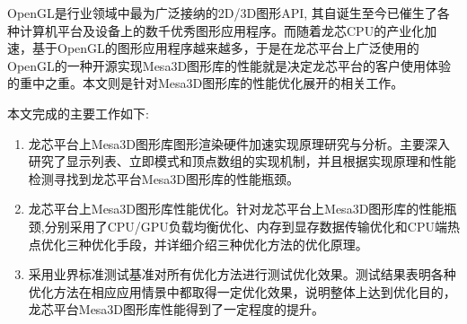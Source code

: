

\makeatletter

\makeatother








\begin{cabstract}

  OpenGL是行业领域中最为广泛接纳的2D/3D图形API, 其自诞生至今已催生了各种计算机平台及设备上的数千优秀图形应用程序。而随着龙芯CPU的产业化加速，基于OpenGL的图形应用程序越来越多，于是在龙芯平台上广泛使用的OpenGL的一种开源实现Mesa3D图形库的性能就是决定龙芯平台的客户使用体验的重中之重。本文则是针对Mesa3D图形库的性能优化展开的相关工作。

  本文完成的主要工作如下:
\begin{enumerate}[1]
\item 龙芯平台上Mesa3D图形库图形渲染硬件加速实现原理研究与分析。主要深入研究了显示列表、立即模式和顶点数组的实现机制，并且根据实现原理和性能检测寻找到龙芯平台Mesa3D图形库的性能瓶颈。
\item 龙芯平台上Mesa3D图形库性能优化。针对龙芯平台上Mesa3D图形库的性能瓶颈,分别采用了CPU/GPU负载均衡优化、内存到显存数据传输优化和CPU端热点优化三种优化手段，并详细介绍三种优化方法的优化原理。
\item 采用业界标准测试基准对所有优化方法进行测试优化效果。测试结果表明各种优化方法在相应应用情景中都取得一定优化效果，说明整体上达到优化目的，龙芯平台Mesa3D图形库性能得到了一定程度的提升。
\end{enumerate}	

\end{cabstract}

